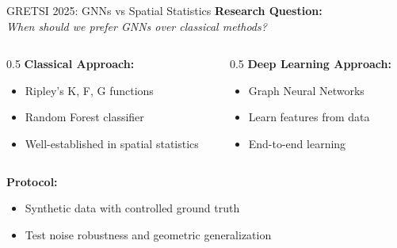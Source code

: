 \documentclass[aspectratio=169]{beamer}
\begin{document}
\begin{frame}{GRETSI 2025: GNNs vs Spatial Statistics}
    \textbf{Research Question:}\\
    \textit{When should we prefer GNNs over classical methods?}
    
    \vspace{0.5em}
    \begin{columns}
        \begin{column}{0.5\textwidth}
            \textbf{Classical Approach:}
            \begin{itemize}
                \item Ripley's K, F, G functions
                \item Random Forest classifier
                \item Well-established in spatial statistics
            \end{itemize}
        \end{column}
        \begin{column}{0.5\textwidth}
            \textbf{Deep Learning Approach:}
            \begin{itemize}
                \item Graph Neural Networks
                \item Learn features from data
                \item End-to-end learning
            \end{itemize}
        \end{column}
    \end{columns}
    
    \vspace{0.5em}
    \textbf{Protocol:}
    \begin{itemize}
        \item Synthetic data with controlled ground truth
        \item Test noise robustness and geometric generalization
    \end{itemize}
\end{frame}
\end{document}
